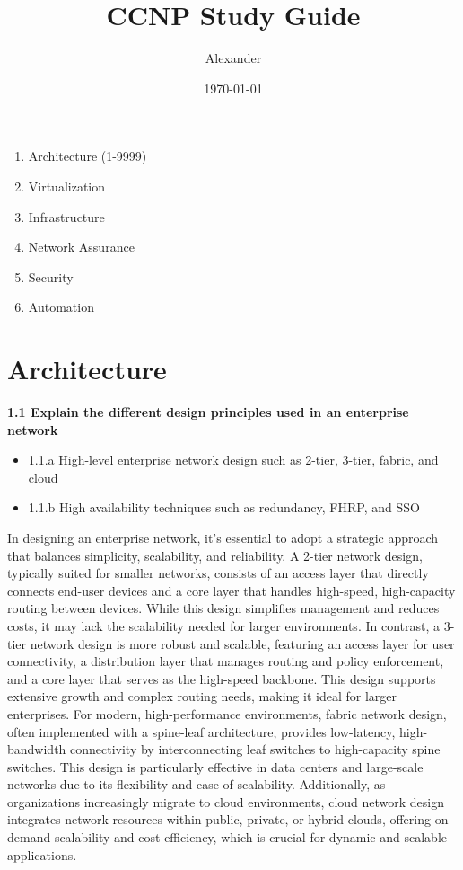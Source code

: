 \documentclass{article}
\title{CCNP Study Guide}
\author{Alexander}
\date{\today}
\begin{document}
\maketitle

\begin{enumerate}
\item Architecture (1-9999)
\item Virtualization
\item Infrastructure
\item Network Assurance
\item Security
\item Automation
\end{enumerate}

\section{Architecture}
\textbf{1.1 Explain the different design principles used in an enterprise network}
\begin{itemize}
\item 1.1.a High-level enterprise network design such as 2-tier, 3-tier, fabric, and cloud
\item 1.1.b High availability techniques such as redundancy, FHRP, and SSO
\end{itemize}

	In designing an enterprise network, it's essential to adopt a strategic approach that balances simplicity, scalability, and reliability. A 2-tier network design, typically suited for smaller networks, consists of an access layer that directly connects end-user devices and a core layer that handles high-speed, high-capacity routing between devices. While this design simplifies management and reduces costs, it may lack the scalability needed for larger environments. In contrast, a 3-tier network design is more robust and scalable, featuring an access layer for user connectivity, a distribution layer that manages routing and policy enforcement, and a core layer that serves as the high-speed backbone. This design supports extensive growth and complex routing needs, making it ideal for larger enterprises. For modern, high-performance environments, fabric network design, often implemented with a spine-leaf architecture, provides low-latency, high-bandwidth connectivity by interconnecting leaf switches to high-capacity spine switches. This design is particularly effective in data centers and large-scale networks due to its flexibility and ease of scalability. Additionally, as organizations increasingly migrate to cloud environments, cloud network design integrates network resources within public, private, or hybrid clouds, offering on-demand scalability and cost efficiency, which is crucial for dynamic and scalable applications.\\
\end{document}

